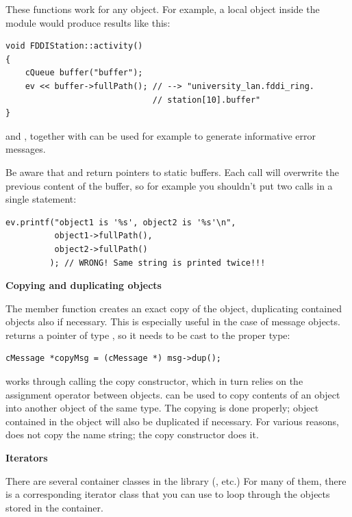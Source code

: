 These functions work for any object. For example, a local object
inside the module would produce results like this:


\begin{verbatim}
void FDDIStation::activity()
{
    cQueue buffer("buffer");
    ev << buffer->fullPath(); // --> "university_lan.fddi_ring.
                              // station[10].buffer"
}
\end{verbatim}



 and , together with
 can be used for example to generate informative
error messages.

Be aware that  and  return
pointers to static buffers. Each call will overwrite the previous
content of the buffer, so for example you shouldn't put two calls in a
single  statement:

\begin{verbatim}
ev.printf("object1 is '%s', object2 is '%s'\n",
          object1->fullPath(),
          object2->fullPath()
         ); // WRONG! Same string is printed twice!!!
\end{verbatim}


\textbf{Copying and duplicating objects}


The  member function creates an exact copy of the
object, duplicating
contained objects also if necessary. This is especially useful in the
case of message objects.  returns a pointer of type
, so it needs to be cast to the proper type:

\begin{verbatim}
cMessage *copyMsg = (cMessage *) msg->dup();
\end{verbatim}


 works through calling the copy constructor, which in
turn relies on the assignment operator between objects.
 can be used to copy contents of an object into
another object of the same type. The copying is done properly; object
contained in the object will also be duplicated if necessary. For
various reasons,  does not copy the name string;
the copy constructor does it.


\textbf{Iterators}


There are several container classes in the library (,
 etc.) For many of them, there is a corresponding
iterator class that you can use to loop through the objects stored in
the container.

